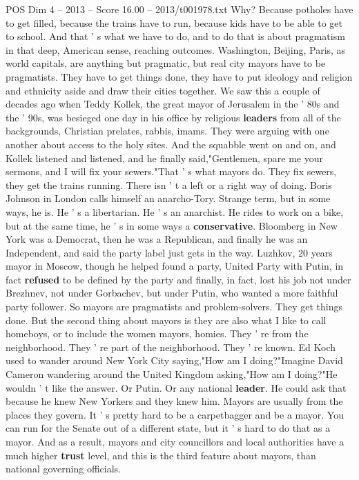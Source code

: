 \begin{textsample}{POS Dim 4 – 2013 – Score 16.00 – 2013/t001978.txt}
Why?
Because potholes have to get filled, because the trains have to run, because kids have to be able to get to school.
And that ' s what we have to do, and to do that is about pragmatism in that deep, American sense, reaching outcomes.
Washington, Beijing, Paris, as world capitals, are anything but pragmatic, but real city mayors have to be pragmatists.
They have to get things done, they have to put ideology and religion and ethnicity aside and draw their cities together.
We saw this a couple of decades ago when Teddy Kollek, the great mayor of Jerusalem in the ' 80s and the ' 90s, was besieged one day in his office by religious \textbf{leaders} from all of the backgrounds, Christian prelates, rabbis, imams.
They were arguing with one another about access to the holy sites.
And the squabble went on and on, and Kollek listened and listened, and he finally said,"Gentlemen, spare me your sermons, and I will fix your sewers."That ' s what mayors do.
They fix sewers, they get the trains running.
There isn ' t a left or a right way of doing.
Boris Johnson in London calls himself an anarcho-Tory.
Strange term, but in some ways, he is.
He ' s a libertarian.
He ' s an anarchist.
He rides to work on a bike, but at the same time, he ' s in some ways a \textbf{conservative}.
Bloomberg in New York was a Democrat, then he was a Republican, and finally he was an Independent, and said the party label just gets in the way.
Luzhkov, 20 years mayor in Moscow, though he helped found a party, United Party with Putin, in fact \textbf{refused} to be defined by the party and finally, in fact, lost his job not under Brezhnev, not under Gorbachev, but under Putin, who wanted a more faithful party follower.
So mayors are pragmatists and problem-solvers.
They get things done.
But the second thing about mayors is they are also what I like to call homeboys, or to include the women mayors, homies.
They ' re from the neighborhood.
They ' re part of the neighborhood.
They ' re known.
Ed Koch used to wander around New York City saying,"How am I doing?"Imagine David Cameron wandering around the United Kingdom asking,"How am I doing?"He wouldn ' t like the answer.
Or Putin.
Or any national \textbf{leader}.
He could ask that because he knew New Yorkers and they knew him.
Mayors are usually from the places they govern.
It ' s pretty hard to be a carpetbagger and be a mayor.
You can run for the Senate out of a different state, but it ' s hard to do that as a mayor.
And as a result, mayors and city councillors and local authorities have a much higher \textbf{trust} level, and this is the third feature about mayors, than national governing officials.

\end{textsample}

